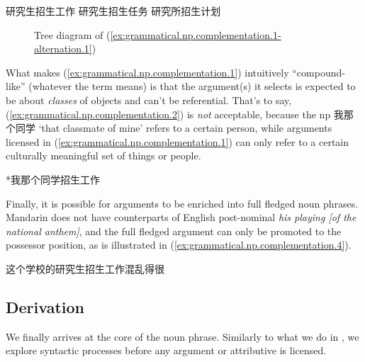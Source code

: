 \documentclass[UTF8, a4paper, oneside, scheme=plain, 12pt]{ctexrep}
\newcommand{\form}[1]{\emph{#1}}
\newcommand{\translate}[1]{`#1'}
\begin{document}
\begin{exe}
    \ex\label{ex:grammatical.np.complementation.3} \begin{xlist}
        \ex\label{ex:grammatical.np.complementation.3.1} 研究生招生工作
        \ex 研究生招生任务
        \ex 研究所招生计划
    \end{xlist}
\end{exe}

\begin{figure}[H]
    \centering
    {
        \small
        
    }
    \caption{Tree diagram of (\ref{ex:grammatical.np.complementation.1-alternation.1})}
    \label{fig:grammatical.np.complementation.1-alternation.1}
\end{figure}

What makes (\ref{ex:grammatical.np.complementation.1}) intuitively ``compound-like'' (whatever the term means) is that
the argument(s) it selects is expected to be about \emph{classes} of objects and can't be referential.
That's to say, (\ref{ex:grammatical.np.complementation.2})
is \emph{not} acceptable, because the \ac{np} 我那个同学 \translate{that classmate of mine}
refers to a certain person, while arguments licensed in (\ref{ex:grammatical.np.complementation.1})
can only refer to a certain culturally meaningful set of things or people.

\begin{exe}
    \ex\label{ex:grammatical.np.complementation.2} *我那个同学招生工作
\end{exe}

Finally, it is possible for arguments to be enriched into full fledged noun phrases.
Mandarin does not have counterparts of English post-nominal \form{his playing [of the national anthem]},
and the full fledged argument can only be promoted to the possessor position,
as is illustrated in (\ref{ex:grammatical.np.complementation.4}).

\begin{exe}
    \ex\label{ex:grammatical.np.complementation.4} 这个学校的研究生招生工作混乱得很
\end{exe}

\subsection{Derivation}\label{sec:grammatical.np.derivation}

We finally arrives at the core of the noun phrase.
Similarly to what we do in ,
we explore syntactic processes before any argument or attributive is licensed.
\end{document}
